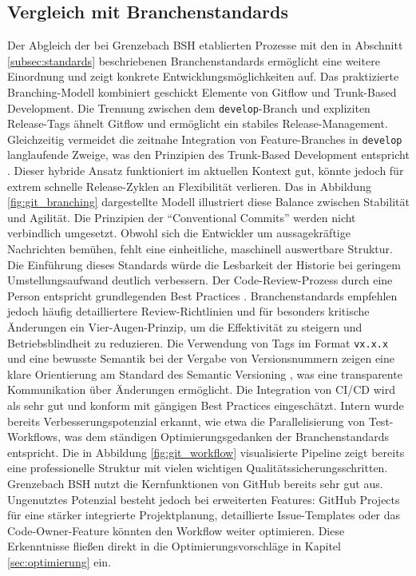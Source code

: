 \documentclass[12pt,oneside]{article}
\begin{document}
    \subsection{Vergleich mit Branchenstandards}
    \label{subsec:vergleich_vk}
    Der Abgleich der bei Grenzebach BSH etablierten Prozesse mit den in Abschnitt \ref{subsec:standards} beschriebenen Branchenstandards ermöglicht eine weitere Einordnung und zeigt konkrete Entwicklungsmöglichkeiten auf.
    \newline
    Das praktizierte Branching-Modell kombiniert geschickt Elemente von Gitflow und Trunk-Based Development. Die Trennung zwischen dem \texttt{develop}-Branch und expliziten Release-Tags ähnelt Gitflow und ermöglicht ein stabiles Release-Management. Gleichzeitig vermeidet die zeitnahe Integration von Feature-Branches in \texttt{develop} langlaufende Zweige, was den Prinzipien des Trunk-Based Development entspricht \cite{AtlassianGitWorkflows}. Dieser hybride Ansatz funktioniert im aktuellen Kontext gut, könnte jedoch für extrem schnelle Release-Zyklen an Flexibilität verlieren. Das in Abbildung \ref{fig:git_branching} dargestellte Modell illustriert diese Balance zwischen Stabilität und Agilität.
    \newline
    Die Prinzipien der ``Conventional Commits'' \cite{ConventionalCommitsOrgDe} werden nicht verbindlich umgesetzt. Obwohl sich die Entwickler um aussagekräftige Nachrichten bemühen, fehlt eine einheitliche, maschinell auswertbare Struktur. Die Einführung dieses Standards würde die Lesbarkeit der Historie bei geringem Umstellungsaufwand deutlich verbessern.
    \newline
    Der Code-Review-Prozess durch eine Person entspricht grundlegenden Best Practices \cite{AtlassianWasIstEinPullRequest}. Branchenstandards empfehlen jedoch häufig detailliertere Review-Richtlinien und für besonders kritische Änderungen ein Vier-Augen-Prinzip, um die Effektivität zu steigern und Betriebsblindheit zu reduzieren.
    \newline
    Die Verwendung von Tags im Format \texttt{vx.x.x} und eine bewusste Semantik bei der Vergabe von Versionsnummern zeigen eine klare Orientierung am Standard des Semantic Versioning \cite{SemVerOrgDe}, was eine transparente Kommunikation über Änderungen ermöglicht.
    \newline
    Die Integration von CI/CD wird als sehr gut und konform mit gängigen Best Practices eingeschätzt. Intern wurde bereits Verbesserungspotenzial erkannt, wie etwa die Parallelisierung von Test-Workflows, was dem ständigen Optimierungsgedanken der Branchenstandards entspricht. Die in Abbildung \ref{fig:git_workflow} visualisierte Pipeline zeigt bereits eine professionelle Struktur mit vielen wichtigen Qualitätssicherungsschritten.
    \newline
    Grenzebach BSH nutzt die Kernfunktionen von GitHub bereits sehr gut aus. Ungenutztes Potenzial besteht jedoch bei erweiterten Features: GitHub Projects für eine stärker integrierte Projektplanung, detaillierte Issue-Templates oder das Code-Owner-Feature könnten den Workflow weiter optimieren. Diese Erkenntnisse fließen direkt in die Optimierungsvorschläge in Kapitel \ref{sec:optimierung} ein.
\end{document}
